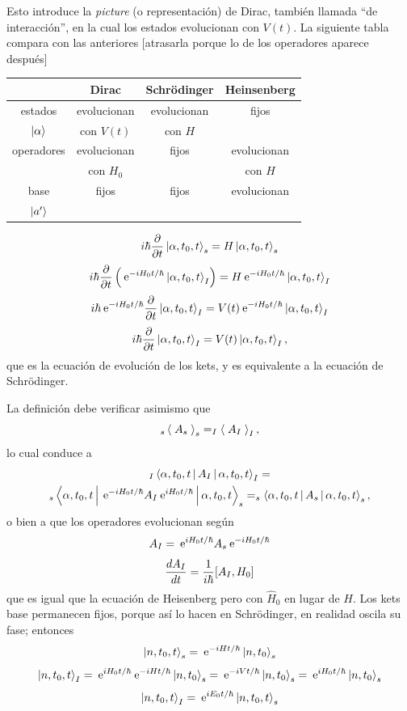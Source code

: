 \documentclass[10pt,oneside]{CBFT_book}
\begin{document}
Esto introduce la {\it picture} (o representación) de Dirac, también llamada ``de interacción'', en la 
cual los estados evolucionan con $V(t)$.
La siguiente tabla compara con las anteriores [atrasarla porque lo de los operadores aparece después]
\begin{center}
\begin{tabular}{|c|ccc|}
\hline 
& Dirac & Schrödinger & Heinsenberg \\
\hline 
estados & evolucionan & evolucionan & fijos \\
$\Ket{\alpha}$ & con $V(t)$ & con $H$ &  \\
\hline
operadores & evolucionan & fijos & evolucionan \\
 & con $H_0$ &  & con $H$ \\
\hline
base & fijos & fijos & evolucionan \\
$\Ket{a'}$ &  &  &  \\
\hline 
\end{tabular}
\end{center}

\[
	i\hbar \frac{\partial^{\hspace{-0.05em}} {}}{\partial {t}^{\hspace{-0.05em}}}\Ket{\alpha,t_0,t}_s = H \Ket{\alpha,t_0,t}_s
\]
\[
	i\hbar \frac{\partial^{\hspace{-0.05em}} {}}{\partial {t}^{\hspace{-0.05em}}}\left( \:\mathrm{e}^{-iH_0t/\hbar}\Ket{\alpha,t_0,t}_I \right) = 
	H \:\mathrm{e}^{-iH_0t/\hbar} \Ket{\alpha,t_0,t}_I
\]
\[
	i\hbar \:\mathrm{e}^{-iH_0t/\hbar}\frac{\partial^{\hspace{-0.05em}} {}}{\partial {t}^{\hspace{-0.05em}}} \Ket{\alpha,t_0,t}_I = 
	V(t) \:\mathrm{e}^{-iH_0t/\hbar} \Ket{\alpha,t_0,t}_I
\]
\[
	i\hbar \frac{\partial^{\hspace{-0.05em}} {}}{\partial {t}^{\hspace{-0.05em}}} \Ket{\alpha,t_0,t}_I = V(t) \Ket{\alpha,t_0,t}_I,
\]
que es la ecuación de evolución de los kets, y es equivalente a la ecuación de Schrödinger.

La definición debe verificar asimismo que 
\[
	_s\Braket{\; A_s \;}_s = _I\Braket{\; A_I \;}_I,
\]
lo cual conduce a
\begin{multline*}
	_I\Braket{\alpha,t_0,t|A_I|\alpha,t_0,t}_I = \\
	_s\Braket{\alpha,t_0,t|\:\mathrm{e}^{-iH_0t/\hbar}A_I\:\mathrm{e}^{iH_0t/\hbar}|\alpha,t_0,t}_s = 
	_s\Braket{\alpha,t_0,t|A_s|\alpha,t_0,t}_s,
\end{multline*}
o bien a que los operadores evolucionan según 
\[
	A_I = \:\mathrm{e}^{iH_0t/\hbar}A_s\:\mathrm{e}^{-iH_0t/\hbar}
\]
\[
	\frac{d^{\hspace{-0.05em}} {A_I}}{d {t}^{\hspace{-0.05em}}} = \frac{1}{i\hbar}[A_I, H_0]
\]
que es igual que la ecuación de Heisenberg pero con $\hat{H}_0$ en lugar de $H$.
Los kets base permanecen fijos, porque así lo hacen en Schrödinger, en realidad oscila su fase; entonces 
\[
	\Ket{n,t_0,t}_s = \:\mathrm{e}^{-iHt/\hbar} \ket{n,t_0}_s
\]
\[
	\Ket{n,t_0,t}_I = \:\mathrm{e}^{iH_0t/\hbar} \:\mathrm{e}^{-iHt/\hbar} \ket{n,t_0}_s =
	\:\mathrm{e}^{-iVt/\hbar} \ket{n,t_0}_s = \:\mathrm{e}^{iH_0t/\hbar} \ket{n,t_0}_s
\]
\[
	\Ket{n,t_0,t}_I = \:\mathrm{e}^{iE_0t/\hbar} \ket{n,t_0,t}_s
\]
\end{document}
